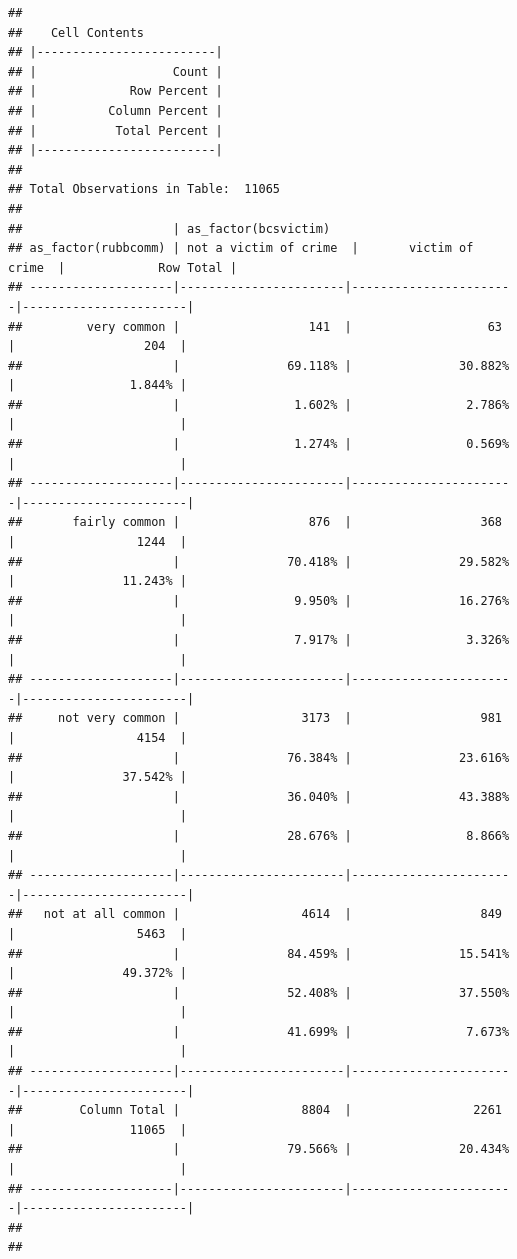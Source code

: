 \documentclass[
]{book}
\begin{document}
\begin{verbatim}
## 
##    Cell Contents
## |-------------------------|
## |                   Count |
## |             Row Percent |
## |          Column Percent |
## |           Total Percent |
## |-------------------------|
## 
## Total Observations in Table:  11065 
## 
##                     | as_factor(bcsvictim) 
## as_factor(rubbcomm) | not a victim of crime  |       victim of crime  |             Row Total | 
## --------------------|-----------------------|-----------------------|-----------------------|
##         very common |                  141  |                   63  |                  204  | 
##                     |               69.118% |               30.882% |                1.844% | 
##                     |                1.602% |                2.786% |                       | 
##                     |                1.274% |                0.569% |                       | 
## --------------------|-----------------------|-----------------------|-----------------------|
##       fairly common |                  876  |                  368  |                 1244  | 
##                     |               70.418% |               29.582% |               11.243% | 
##                     |                9.950% |               16.276% |                       | 
##                     |                7.917% |                3.326% |                       | 
## --------------------|-----------------------|-----------------------|-----------------------|
##     not very common |                 3173  |                  981  |                 4154  | 
##                     |               76.384% |               23.616% |               37.542% | 
##                     |               36.040% |               43.388% |                       | 
##                     |               28.676% |                8.866% |                       | 
## --------------------|-----------------------|-----------------------|-----------------------|
##   not at all common |                 4614  |                  849  |                 5463  | 
##                     |               84.459% |               15.541% |               49.372% | 
##                     |               52.408% |               37.550% |                       | 
##                     |               41.699% |                7.673% |                       | 
## --------------------|-----------------------|-----------------------|-----------------------|
##        Column Total |                 8804  |                 2261  |                11065  | 
##                     |               79.566% |               20.434% |                       | 
## --------------------|-----------------------|-----------------------|-----------------------|
## 
## 
\end{verbatim}
\end{document}
